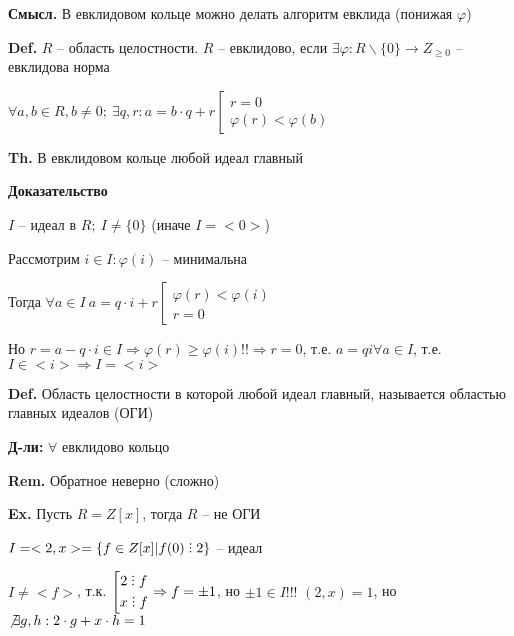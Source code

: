 \documentclass[14pt, letter paper]{article}
\def\divby{%
  \mathrel{\text{\vbox{\baselineskip.65ex\lineskiplimit0pt\hbox{.}\hbox{.}\hbox{.}}}}%
}
\begin{document}
\textbf{Смысл.} В евклидовом кольце можно делать алгоритм евклида (понижая $\varphi$)

\vspace{5mm}

\textbf{Def.} $R$ -- область целостности. $R$ -- евклидово, если $\exists \varphi : R\backslash\{0\} \rightarrow Z_{\geq 0}$ -- евклидова норма

$\forall a, b \in R, b \neq 0;\ \exists q, r : a = b \cdot q + r \left[ \begin{gathered}
    r = 0 \\
    \varphi(r) < \varphi(b)
\end{gathered} \right.$

\textbf{Th.} В евклидовом кольце любой идеал главный

\begin{center}
    \textbf{Доказательство}
\end{center}

$I$ -- идеал в $R;\ I \neq \{0\}$ (иначе $I = <0>$)

Рассмотрим $i \in I : \varphi(i)$ -- минимальна

Тогда $\forall a \in I\ a = q \cdot i + r \left[ \begin{gathered}
    \varphi(r) < \varphi(i) \\
    r = 0
\end{gathered} \right.$

Но $r = a - q \cdot i \in I \Rightarrow \varphi(r) \geq \varphi(i) !! \Rightarrow r = 0$, т.е. $a = qi \forall a \in I$, т.е. $I \in <i> \Rightarrow I = <i>$

\vspace{5mm}

\textbf{Def.} Область целостности в которой любой идеал главный, называется областью главных идеалов (ОГИ)

\textbf{Д-ли:} $\forall$ евклидово кольцо

\textbf{Rem.} Обратное неверно (сложно)

\textbf{Ex.} Пусть $R = Z[x]$, тогда $R$ -- не ОГИ

$I = <2, x> = \{f \in Z[x] | f(0) \divby 2\}$ -- идеал

$I \neq <f>$, т.к. $\left[ \begin{gathered}
    2 \divby f \\
    x \divby f
\end{gathered} \right. \Rightarrow f = \pm 1$, но $\pm 1 \in I!!!$ $(2, x) = 1$, но $\not \exists g, h : 2 \cdot g + x \cdot h = 1$
\end{document}
